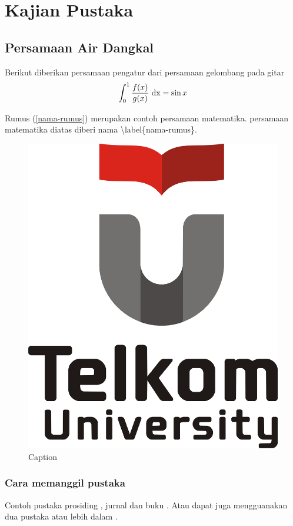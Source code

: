 \chapter{Kajian Pustaka}

\section{Persamaan Air Dangkal}
Berikut diberikan persamaan pengatur dari persamaan gelombang pada gitar
\begin{equation}\label{nama-rumus}
    \int_0^1 \frac{f(x)}{g(x)}\ {\rm dx}=\sin x
\end{equation}

Rumus (\ref{nama-rumus}) merupakan contoh persamaan matematika. persamaan matematika diatas diberi nama \textbackslash label\{nama-rumus\}.

\begin{figure}[h!]
    \centering
    \includegraphics[scale=0.3]{Tel-U-Logo.png}
    \caption{Caption}
    \label{fig:my_label}
\end{figure}
\subsection{Cara memanggil pustaka}
Contoh pustaka prosiding \cite{doyen2014explicit}, jurnal \cite{gunawan2015hydrostatic} dan buku \cite{toro2013riemann}. Atau dapat juga mengguanakan dua pustaka atau lebih dalam \cite{gunawan2015hydrostatic,toro2013riemann}.